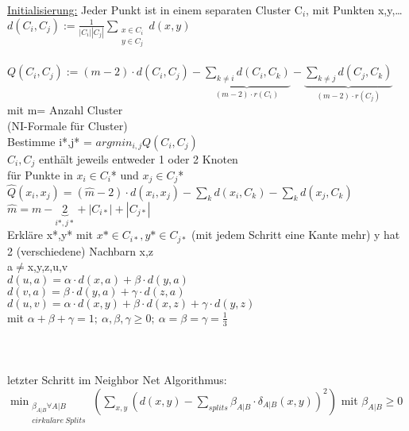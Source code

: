 \underline{Initialisierung:} Jeder Punkt ist in einem separaten Cluster C$_i$, mit Punkten x,y,…\\
$d(C_i,C_j):=\frac{1}{|C_i||C_j|} \displaystyle \sum_{\substack{x \in C_i \\ y \in C_j}}d(x,y)$\\
\\
$Q(C_i,C_j):=(m-2) \cdot d(C_i,C_j) - \displaystyle \underbrace{\sum_{k \neq i} d(C_i,C_k)}_{(m-2) \cdot r(C_i)} - \displaystyle \underbrace{\sum_{k \neq j} d(C_j,C_k)}_{(m-2) \cdot r(C_j)}$\\
mit m= Anzahl Cluster\\
(NI-Formale für Cluster)\\
Bestimme i*,j* = $argmin_{i,j} Q(C_i,C_j)$\\
$C_i,C_j$ enthält jeweils entweder 1 oder 2 Knoten\\
für Punkte in $x_i \in C_i$* und $x_j \in C_j$*\\
$\hat Q(x_i,x_j)=(\hat m -2) \cdot d(x_i,x_j) - \displaystyle \sum_{k} d(x_i,C_k) - \displaystyle \sum_{k} d(x_j,C_k)$\\
$\hat m = m - \underbrace{2}_{i*,j*} + |C_{i*}| + |C_{j*}|$\\
Erkläre x*,y* mit $x* \in C_{i*}, y* \in C_{j*}$ (mit jedem Schritt eine Kante mehr)
y hat 2 (verschiedene) Nachbarn x,z\\
a$\neq$x,y,z,u,v\\
$d(u,a)=\alpha \cdot d(x,a) + \beta \cdot d(y,a)$\\
$d(v,a)=\beta \cdot d(y,a) + \gamma \cdot d(z,a)$\\
$d(u,v)=\alpha \cdot d(x,y) + \beta \cdot d(x,z) + \gamma \cdot d(y,z)$\\
mit $\alpha + \beta + \gamma = 1;\ \alpha,\beta,\gamma \geq 0;\ \alpha=\beta=\gamma=\frac{1}{3}$\\\\
\\\\
letzter Schritt im Neighbor Net Algorithmus:\\
$\displaystyle \min_{\substack{\beta_{A|B} \forall A|B \\ cirkul\ddot{a}re\ Splits}} (\sum_{x,y} (d(x,y) - \sum_{splits} \beta_{A|B} \cdot \delta_{A|B}(x,y))^2)$ mit $\beta_{A|B} \geq 0$\\

